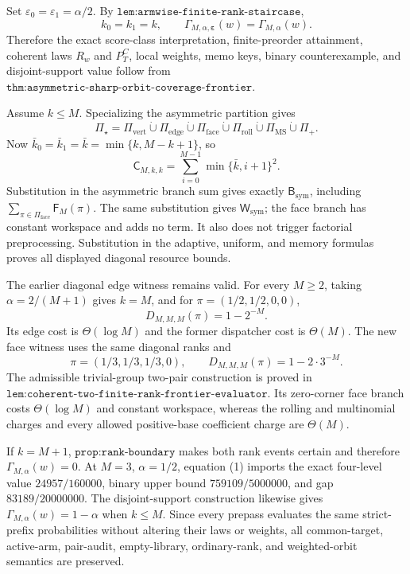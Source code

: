 Set
\(\varepsilon_0=\varepsilon_1=\alpha/2\). By
\(\texttt{lem:armwise-finite-rank-staircase}\),
\[
k_0=k_1=k,\qquad
\Gamma_{M,\alpha,\boldsymbol\varepsilon}(w)
=\Gamma_{M,\alpha}(w).
\tag{1}
\]
Therefore the exact score-class interpretation, finite-preorder attainment, coherent laws \(R_w\) and \(P_T^C\), local weights, memo keys, binary counterexample, and disjoint-support value follow from
\(\texttt{thm:asymmetric-sharp-orbit-coverage-frontier}\).

Assume \(k\le M\). Specializing the asymmetric partition gives
\[
\Pi_\star=\Pi_{\mathrm{vert}}\mathbin{\dot\cup}
\Pi_{\mathrm{edge}}\mathbin{\dot\cup}
\Pi_{\mathrm{face}}\mathbin{\dot\cup}
\Pi_{\mathrm{roll}}\mathbin{\dot\cup}
\Pi_{\mathrm{MS}}\mathbin{\dot\cup}\Pi_+.
\tag{2}
\]
Now \(\bar k_0=\bar k_1=\bar k=\min\{k,M-k+1\}\), so
\[
\mathsf C_{M,k,k}
=\sum_{i=0}^{M-1}\min\{\bar k,i+1\}^2.
\]
Substitution in the asymmetric branch sum gives exactly
\(\mathsf B_{\mathrm{sym}}\), including
\(\sum_{\pi\in\Pi_{\mathrm{face}}}\mathsf F_M(\pi)\).
The same substitution gives \(\mathsf W_{\mathrm{sym}}\); the face branch has constant workspace and adds no term. It also does not trigger factorial preprocessing. Substitution in the adaptive, uniform, and memory formulas proves all displayed diagonal resource bounds.

The earlier diagonal edge witness remains valid. For every \(M\ge2\), taking
\(\alpha=2/(M+1)\) gives \(k=M\), and for
\(\pi=(1/2,1/2,0,0)\),
\[
D_{M,M,M}(\pi)=1-2^{-M}.
\]
Its edge cost is \(\Theta(\log M)\) and the former dispatcher cost is
\(\Theta(M)\). The new face witness uses the same diagonal ranks and
\[
\pi=(1/3,1/3,1/3,0),\qquad
D_{M,M,M}(\pi)=1-2\cdot3^{-M}.
\]
The admissible trivial-group two-pair construction is proved in
\(\texttt{lem:coherent-two-finite-rank-frontier-evaluator}\). Its zero-corner face branch costs \(\Theta(\log M)\) and constant workspace, whereas the rolling and multinomial charges and every allowed positive-base coefficient charge are \(\Theta(M)\).

If \(k=M+1\), \(\texttt{prop:rank-boundary}\) makes both rank events certain and therefore \(\Gamma_{M,\alpha}(w)=0\). At
\(M=3\), \(\alpha=1/2\), equation (1) imports the exact four-level value
\(24957/160000\), binary upper bound \(759109/5000000\), and gap
\(83189/20000000\). The disjoint-support construction likewise gives
\(\Gamma_{M,\alpha}(w)=1-\alpha\) when \(k\le M\). Since every prepass evaluates the same strict-prefix probabilities without altering their laws or weights, all common-target, active-arm, pair-audit, empty-library, ordinary-rank, and weighted-orbit semantics are preserved.